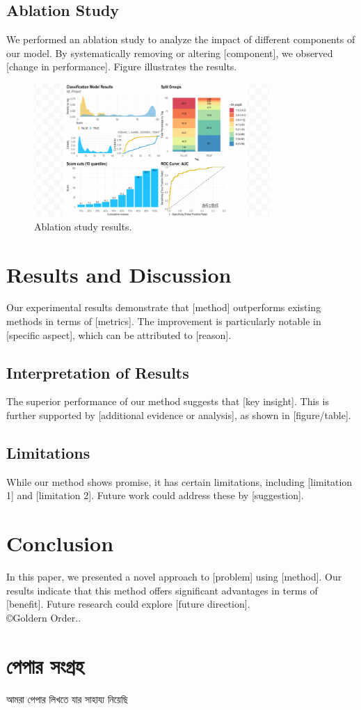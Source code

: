 \documentclass{article}
\begin{document}
\subsection{Ablation Study}
We performed an ablation study to analyze the impact of different components of our model. By systematically removing or altering [component], we observed [change in performance]. Figure illustrates the results.

\begin{figure}[h]
    \centering
    \includegraphics[width=0.8\textwidth]{1.png}
    \caption{Ablation study results.}
    \label{fig:ablation}
\end{figure}

\section{Results and Discussion}
Our experimental results demonstrate that [method] outperforms existing methods in terms of [metrics]. The improvement is particularly notable in [specific aspect], which can be attributed to [reason].

\subsection{Interpretation of Results}
The superior performance of our method suggests that [key insight]. This is further supported by [additional evidence or analysis], as shown in [figure/table].

\subsection{Limitations}
While our method shows promise, it has certain limitations, including [limitation 1] and [limitation 2]. Future work could address these by [suggestion].

\section{Conclusion}
In this paper, we presented a novel approach to [problem] using [method]. Our results indicate that this method offers significant advantages in terms of [benefit]. Future research could explore [future direction].\\
\copyright Goldern Order.. 

\section{\bn পেপার সংগ্রহ}
\bn আমরা পেপার লিখতে যার সাহায্য নিয়েছি 
 \cite{vartak2016modeldb}\\ 



\end{document}
